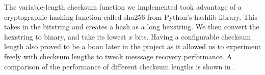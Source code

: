 \documentclass[titlepage]{article}
\begin{document}
The variable-length checksum function we implemented took advantage of a cryptographic hashing function called sha256 from Python's hashlib library. This takes in the bitstring and creates a hash as a long hexstring. We then convert the hexstring to binary, and take its lowest $x$ bits. Having a configurable checksum length also proved to be a boon later in the project as it allowed us to experiment freely with checksum lengths to tweak messsage recovery performance. A comparison of the performance of different checksum lengths is shown in .

\begin{figure}
\end{figure}
\end{document}
